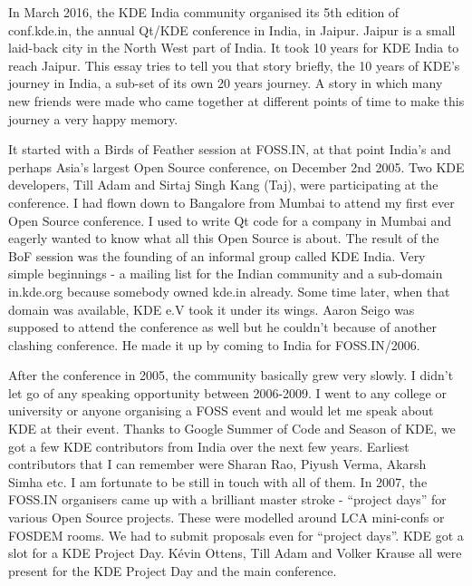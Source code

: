 


\noindent{}In March 2016, the KDE India community organised its 5th edition of conf.kde.in, the annual Qt/KDE conference in India, in Jaipur. Jaipur is a small laid-back city in the North West part of India. It took 10 years for KDE India to reach Jaipur. This essay tries to tell you that story briefly, the 10 years of KDE's journey in India, a sub-set of its own 20 years journey. A story in which many new friends were made who came together at different points of time to make this journey a very happy memory.

It started with a Birds of Feather session at FOSS.IN, at that point India's and perhaps Asia's largest Open Source conference, on December 2nd 2005. Two KDE developers, Till Adam and Sirtaj Singh Kang (Taj), were participating at the conference. I had flown down to Bangalore from Mumbai to attend my first ever Open Source conference. I used to write Qt code for a company in Mumbai and eagerly wanted to know what all this Open Source is about. The result of the BoF session was the founding of an informal group called KDE India. Very simple beginnings - a mailing list for the Indian community and a sub-domain in.kde.org because somebody owned kde.in already. Some time later, when that domain was available, KDE e.V took it under its wings. Aaron Seigo was supposed to attend the conference as well but he couldn't because of another clashing conference. He made it up by coming to India for FOSS.IN/2006.

After the conference in 2005, the community basically grew very slowly. I didn't let go of any speaking opportunity between 2006-2009. I went to any college or university or anyone organising a FOSS event and would let me speak about KDE at their event.  Thanks to Google Summer of Code and Season of KDE, we got a few KDE contributors from India over the next few years. Earliest contributors that I can remember were Sharan Rao, Piyush Verma, Akarsh Simha etc. I am fortunate to be still in touch with all of them. In 2007, the FOSS.IN organisers came up with a brilliant master stroke - “project days” for various Open Source projects. These were modelled around LCA mini-confs or FOSDEM rooms. We had to submit proposals even for “project days”. KDE got a slot for a KDE Project Day.  Kévin Ottens, Till Adam and Volker Krause all were present for the KDE Project Day and the main conference.

